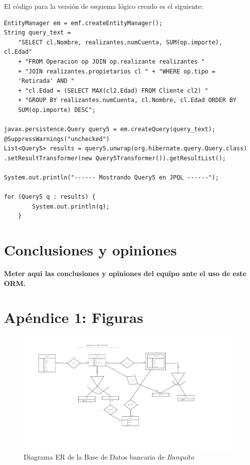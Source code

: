 \documentclass[11pt,a4paper]{article}
\begin{document}
El código para la versión de esquema lógico creado es el siguiente:
\begin{lstlisting}
EntityManager em = emf.createEntityManager();
String query_text = 
  	"SELECT cl.Nombre, realizantes.numCuenta, SUM(op.importe), cl.Edad"
	+ "FROM Operacion op JOIN op.realizante realizantes "
  	+ "JOIN realizantes.propietarios cl " + "WHERE op.tipo =
  	'Retirada' AND "
	+ "cl.Edad = (SELECT MAX(cl2.Edad) FROM Cliente cl2) "
	+ "GROUP BY realizantes.numCuenta, cl.Nombre, cl.Edad ORDER BY 			
	SUM(op.importe) DESC";

javax.persistence.Query query5 = em.createQuery(query_text);
@SuppressWarnings("unchecked")
List<Query5> results = query5.unwrap(org.hibernate.query.Query.class)
.setResultTransformer(new Query5Transformer()).getResultList();

System.out.println("------ Mostrando Query5 en JPQL ------");

for (Query5 q : results) {
      	System.out.println(q);
  	}
\end{lstlisting}

\section{Conclusiones y opiniones}

\textbf{Meter aqui las conclusiones y opiniones del equipo ante el uso de este ORM.}


\newpage
\section{Apéndice 1: Figuras}

\begin{landscape}
\begin{figure}
\centering
\includegraphics[scale=0.75]{images/diagramaer.png}
\caption{Diagrama ER de la Base de Datos bancaria de \emph{Banquito}}
\label{fig:diagramaer}
\end{figure}
\end{landscape}
\end{document}
